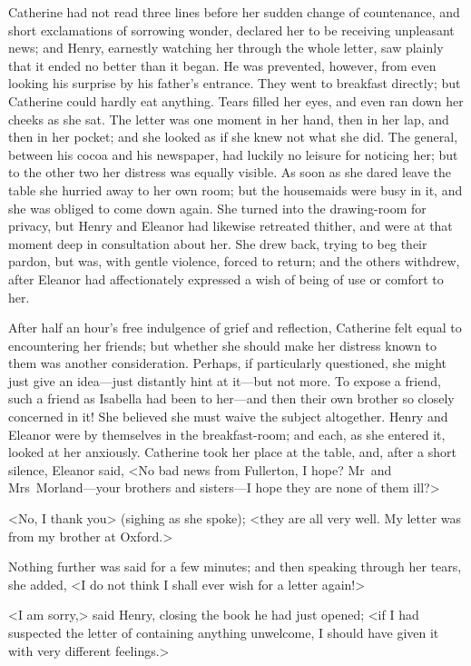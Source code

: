  Catherine had not read three lines before her sudden change of countenance, and short exclamations of sorrowing wonder, declared her to be receiving unpleasant news; and Henry, earnestly watching her through the whole letter, saw plainly that it ended no better than it began. He was prevented, however, from even looking his surprise by his father's entrance. They went to breakfast directly; but Catherine could hardly eat anything. Tears filled her eyes, and even ran down her cheeks as she sat. The letter was one moment in her hand, then in her lap, and then in her pocket; and she looked as if she knew not what she did. The general, between his cocoa and his newspaper, had luckily no leisure for noticing her; but to the other two her distress was equally visible. As soon as she dared leave the table she hurried away to her own room; but the housemaids were busy in it, and she was obliged to come down again. She turned into the drawing-room for privacy, but Henry and Eleanor had likewise retreated thither, and were at that moment deep in consultation about her. She drew back, trying to beg their pardon, but was, with gentle violence, forced to return; and the others withdrew, after Eleanor had affectionately expressed a wish of being of use or comfort to her. 

 After half an hour's free indulgence of grief and reflection, Catherine felt equal to encountering her friends; but whether she should make her distress known to them was another consideration. Perhaps, if particularly questioned, she might just give an idea—just distantly hint at it—but not more. To expose a friend, such a friend as Isabella had been to her—and then their own brother so closely concerned in it! She believed she must waive the subject altogether. Henry and Eleanor were by themselves in the breakfast-room; and each, as she entered it, looked at her anxiously. Catherine took her place at the table, and, after a short silence, Eleanor said, <No bad news from Fullerton, I hope? Mr~and Mrs~Morland—your brothers and sisters—I hope they are none of them ill?> 

 <No, I thank you> (sighing as she spoke); <they are all very well. My letter was from my brother at Oxford.> 

 Nothing further was said for a few minutes; and then speaking through her tears, she added, <I do not think I shall ever wish for a letter again!> 

 <I am sorry,> said Henry, closing the book he had just opened; <if I had suspected the letter of containing anything unwelcome, I should have given it with very different feelings.> 

